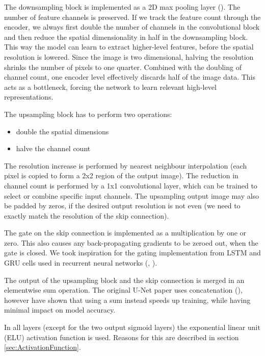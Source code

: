 The downsampling block is implemented as a 2D max pooling layer (\cite{DeepLearningBook}). The number of feature channels is preserved. If we track the feature count through the encoder, we always first double the number of channels in the convolutional block and then reduce the spatial dimensionality in half in the downsampling block. This way the model can learn to extract higher-level features, before the spatial resolution is lowered. Since the image is two dimensional, halving the resolution shrinks the number of pixels to one quarter. Combined with the doubling of channel count, one encoder level effectively discards half of the image data. This acts as a bottleneck, forcing the network to learn relevant high-level representations.

The upsampling block has to perform two operations:

\begin{itemize}
    \item double the spatial dimensions
    \item halve the channel count
\end{itemize}

The resolution increase is performed by nearest neighbour interpolation (each pixel is copied to form a 2x2 region of the output image). The reduction in channel count is performed by a 1x1 convolutional layer, which can be trained to select or combine specific input channels. The upsampling output image may also be padded by zeros, if the desired output resolution is not even (we need to exactly match the resolution of the skip connection).

The gate on the skip connection is implemented as a multiplication by one or zero. This also causes any back-propagating gradients to be zeroed out, when the gate is closed. We took inspiration for the gating implementation from LSTM and GRU cells used in recurrent neural networks (\cite{LSTM}, \cite{GRU}).

The output of the upsampling block and the skip connection is merged in an elementwise sum operation. The original U-Net paper uses concatenation (\cite{UNet}), however \cite{DorferEtAl} have shown that using a sum instead speeds up training, while having minimal impact on model accuracy.

In all layers (except for the two output sigmoid layers) the exponential linear unit (ELU) activation function is used. Reasons for this are described in section \ref{sec:ActivationFunction}.




